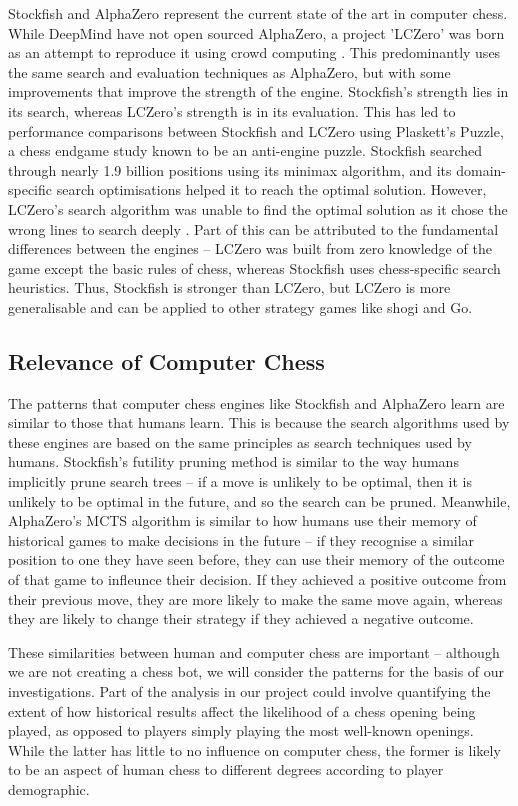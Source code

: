 \documentclass[%
 superscriptaddress,
showpacs,preprintnumbers,
 amsmath,
 amssymb,
 aps,
 pra,
showkeys,
onecolumn,
notitlepage,
11pt,
tightenlines      %
]{revtex4-1}
\begin{document}
Stockfish and AlphaZero represent the current state of the art in computer chess. While DeepMind have not open sourced AlphaZero, a project 'LCZero' was born as an attempt to reproduce it using crowd computing \cite{maharaj2022chess}. This predominantly uses the same search and evaluation techniques as AlphaZero, but with some improvements that improve the strength of the engine. Stockfish's strength lies in its search, whereas LCZero's strength is in its evaluation. This has led to performance comparisons between Stockfish and LCZero using Plaskett's Puzzle, a chess endgame study known to be an anti-engine puzzle. Stockfish searched through nearly 1.9 billion positions using its minimax algorithm, and its domain-specific search optimisations helped it to reach the optimal solution. However, LCZero's search algorithm was unable to find the optimal solution as it chose the wrong lines to search deeply \cite{maharaj2022chess}. Part of this can be attributed to the fundamental differences between the engines -- LCZero was built from zero knowledge of the game except the basic rules of chess, whereas Stockfish uses chess-specific search heuristics. Thus, Stockfish is stronger than LCZero, but LCZero is more generalisable and can be applied to other strategy games like shogi and Go.

\subsection{Relevance of Computer Chess}
The patterns that computer chess engines like Stockfish and AlphaZero learn are similar to those that humans learn. This is because the search algorithms used by these engines are based on the same principles as search techniques used by humans. Stockfish's futility pruning method is similar to the way humans implicitly prune search trees -- if a move is unlikely to be optimal, then it is unlikely to be optimal in the future, and so the search can be pruned. Meanwhile, AlphaZero's MCTS algorithm is similar to how humans use their memory of historical games to make decisions in the future -- if they recognise a similar position to one they have seen before, they can use their memory of the outcome of that game to infleunce their decision. If they achieved a positive outcome from their previous move, they are more likely to make the same move again, whereas they are likely to change their strategy if they achieved a negative outcome.

These similarities between human and computer chess are important -- although we are not creating a chess bot, we will consider the patterns for the basis of our investigations. Part of the analysis in our project could involve quantifying the extent of how historical results affect the likelihood of a chess opening being played, as opposed to players simply playing the most well-known openings. While the latter has little to no influence on computer chess, the former is likely to be an aspect of human chess to different degrees according to player demographic.
\end{document}

